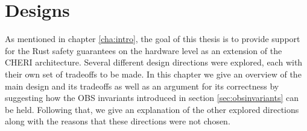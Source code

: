 \newcommand{\V}[1]{\ensuremath{\mathit{#1}}}
\newcommand{\X}[1]{\ensuremath{\mathrm{#1}}}
\newcommand{\Sf}[1]{\ensuremath{\mathsf{#1}}}
\newcommand{\I}[1]{\ensuremath{\mathtt{#1}}}
\newcommand{\K}[1]{\ensuremath{\mathsf{#1}}}
\newcommand{\instr}[1]{\texttt{#1}}
\newcommand{\Z}{\mathbb{Z}}
\newcommand{\confv}{\varphi}
\newcommand{\uninitCol}{RoyalBlue}
\newcommand{\locCol}{RedOrange}
\newcommand{\hlnew}[1]{{\color{\uninitCol}#1}}
\newcommand{\hlnewl}[1]{{\color{\locCol}#1}}
\newcommand{\emphc}[1]{{\color{red}#1}}
\newcommand{\updc}[1]{#1}
\newcommand{\pc}{\K{pc}}
\newcommand{\rgen}[1]{\K{r_{\X{#1}}}}
\newcommand\RW{\perm{rw}}
\newcommand\RWX{\perm{rwx}}
\newcommand\RWL{\perm{rwl}}
\newcommand\RWLX{\perm{rwlx}}
\newcommand\URW{\perm{urw}}
\newcommand\URWX{\perm{urwx}}
\newcommand\URX{\perm{urx}}
\newcommand\URWL{\perm{urwl}}
\newcommand\URWLX{\perm{urwlx}}
\newcommand\RO{\perm{ro}}
\newcommand\RX{\perm{rx}}
\newcommand\enter{\perm{e}}
\newcommand{\instrsem}[1]{\llbracket #1 \rrbracket}
\newcommand{\permflowsto}{\preccurlyeq}
\newcommand{\permflowsfrom}{\succcurlyeq}
\newcommand{\eqdef}{\triangleq}



\chapter{Designs}
\label{chap:design}
As mentioned in chapter \ref{cha:intro}, the goal of this thesis is to provide support for the Rust safety guarantees on the hardware level as an extension of the CHERI architecture. Several different design directions were explored, each with their own set of tradeoffs to be made. In this chapter we give an overview of the main design and its tradeoffs as well as an argument for its correctness by suggesting how the OBS invariants introduced in section \ref{sec:obsinvariants} can be held. Following that, we give an explanation of the other explored directions along with the reasons that these directions were not chosen.

